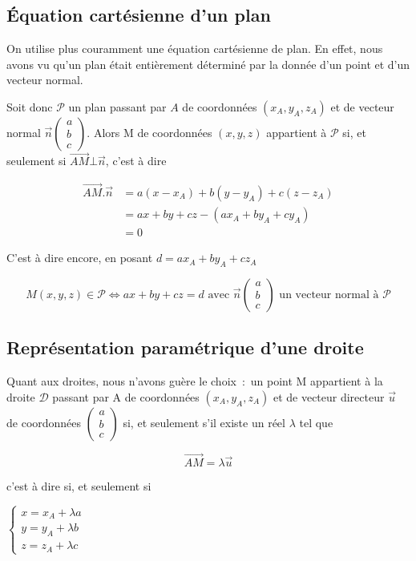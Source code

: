 \documentclass[french]{book}
\newcommand{\cald}{\mathscr{D}}
\newcommand{\calp}{\mathscr{P}}
\newcommand{\ve}[1]{\overrightarrow{#1}}
\newcommand{\ps}[2]{\overrightarrow{#1}.\overrightarrow{#2}}
\newcommand{\la}{\lambda}
\newcommand{\DR}{\cald}
\newcommand{\PR}{\calp}
\newcommand{\ssi}{\Longleftrightarrow}
\newcommand{\coordpp}[3]{\begin{pmatrix}
#1\\
#2\\
#3
\end{pmatrix}}
\begin{document}
\subsection{\'Equation cartésienne d'un plan}

On utilise plus  couramment une équation cartésienne de  plan. En effet,
nous avons vu qu'un plan  était entièrement déterminé par la donnée d'un
point et d'un vecteur normal.  

Soit donc $\PR$  un plan passant par $A$  de coordonnées $(x_A,y_A,z_A)$
et de vecteur normal $\ve{n}\coordpp{a}{b}{c}$.  
Alors M de coordonnées $(x,y,z)$  appartient à $\PR$ si, et seulement si
$\ve{AM}\bot\ve{n}$, c'est à dire 

\begin{center}
\begin{align*}
\ps{AM}{n}&=a(x-x_A)+b(y-y_A)+c(z-z_A)\\
                    &=ax+by+cz-(ax_A+by_A+cy_A)\\
                    &=0
\end{align*}
\end{center}

C'est à dire encore, en posant $d=ax_A+by_A+cz_A$


\begin{prop}
  $$M(x,y,z)\in\PR \ssi ax+by+cz=d \text{ avec  } \ve{n}\coordpp{a}{b}{c}
\text{ un vecteur normal à } \PR $$
\end{prop}






\newpage

\subsection{Représentation paramétrique d'une droite}

Quant aux droites, nous n'avons guère le choix~:~un point M appartient à
la  droite $\DR$  passant par  A  de coordonnées  $(x_A,y_A,z_A)$ et  de
vecteur  directeur $\ve{u}$  de coordonnées  $\coordpp{a}{b}{c}$  si, et
seulement s'il existe un réel $\la$ tel que 

$$ \ve{AM}=\la\ve{u} $$

c'est à dire si, et seulement si

\begin{center}
$ \begin{cases}
x =x_A+\la a\\
y =y_A+\la b\\
z =z_A+\la c
\end{cases}$
\end{center}
\end{document}
